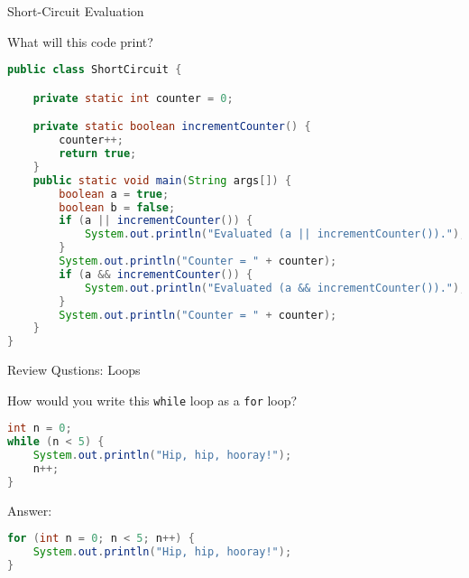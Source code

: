 \documentclass{beamer}
\begin{document}
\begin{frame}[fragile]{Short-Circuit Evaluation}


What will this code print?
\vspace{-.05in}
\begin{lstlisting}[language=Java]
public class ShortCircuit {

    private static int counter = 0;

    private static boolean incrementCounter() {
        counter++;
        return true;
    }
    public static void main(String args[]) {
        boolean a = true;
        boolean b = false;
        if (a || incrementCounter()) {
            System.out.println("Evaluated (a || incrementCounter()).");
        }
        System.out.println("Counter = " + counter);
        if (a && incrementCounter()) {
            System.out.println("Evaluated (a && incrementCounter()).");
        }
        System.out.println("Counter = " + counter);
    }
}
\end{lstlisting}


\end{frame}

\begin{frame}[fragile]{Review Qustions: Loops}


How would you write this {\tt while} loop as a {\tt for} loop?
\begin{lstlisting}[language=Java]
int n = 0;
while (n < 5) {
    System.out.println("Hip, hip, hooray!");
    n++;
}
\end{lstlisting}

Answer:
\begin{lstlisting}[language=Java]
for (int n = 0; n < 5; n++) {
    System.out.println("Hip, hip, hooray!");
}
\end{lstlisting}


\end{frame}
\end{document}
